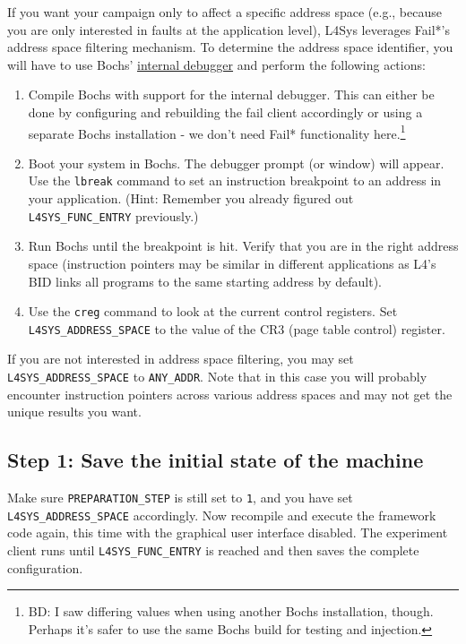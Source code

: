 \documentclass[a4paper,times,9pt]{article}
\newcommand{\lfs}{L4Sys}
\begin{document}
If you want your campaign only to affect a specific address space (e.g.,
because you are only interested in faults at the application level), \lfs{}
leverages Fail*'s address space filtering mechanism. To determine the address
space identifier, you will have to use Bochs'
\href{http://bochs.sourceforge.net/doc/docbook/user/internal-debugger.html}{internal
debugger} and perform the following actions:
\begin{enumerate}[topsep=0em,itemsep=0em]
  \item Compile Bochs with support for the internal debugger. This can either
        be done by configuring and rebuilding the fail client accordingly or
        using a separate Bochs installation - we don't need Fail*
        functionality here.\footnote{BD: I saw differing values when using
        another Bochs installation, though. Perhaps it's safer to use the same
        Bochs build for testing and injection.}
  \item Boot your system in Bochs. The debugger prompt (or window) will
        appear. Use the \verb+lbreak+ command to set an instruction breakpoint
        to an address in your application. (Hint: Remember you already figured
        out \verb+L4SYS_FUNC_ENTRY+ previously.)
  \item Run Bochs until the breakpoint is hit. Verify that you are in the
        right address space (instruction pointers may be similar in different
        applications as L4's BID links all programs to the same starting
        address by default).
  \item Use the \verb+creg+ command to look at the current control registers.
        Set \verb+L4SYS_ADDRESS_SPACE+ to the value of the CR3 (page table
        control) register.     
\end{enumerate}

If you are not interested in address space filtering, you may set
\verb+L4SYS_ADDRESS_SPACE+ to \verb+ANY_ADDR+. Note that in this case you will
probably encounter instruction pointers across various address spaces and may
not get the unique results you want.

\subsection{Step 1: Save the initial state of the machine}

Make sure \verb+PREPARATION_STEP+ is still set to \texttt{1}, and
you have set \verb+L4SYS_ADDRESS_SPACE+ accordingly.
Now recompile and execute the framework code again, this time with the graphical
user interface disabled. The experiment client runs until
\verb+L4SYS_FUNC_ENTRY+ is reached and then saves
the complete configuration.
\end{document}
